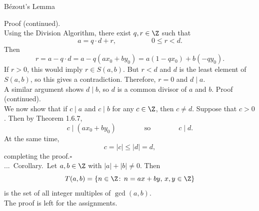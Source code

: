 \documentclass[smaller,hyperref={CJKbookmarks=true}]{beamer}
\newcounter{zhuo}[subsection]
\renewcommand{\thezhuo}{\thesection.\thesubsection.\arabic{zhuo}}
\newenvironment{COROLLARY}{\stepcounter{zhuo}\alert{\thezhuo.~Corollary.\,}}{}
\begin{document}
\begin{frame}{B\'{e}zout's Lemma}
\begin{spacing}{1.1}
\alert{Proof (continued).}\\
Using the Division Algorithm, there exist $q,r\in\Z$ such that
\[a=q\cdot d+r,\qquad\qquad\quad
0\leq r<d.\]
Then
\[r=a-q\cdot d=a-q(ax_0+by_0)=a(1-qx_0)+b(-qy_0).\]
If $r>0$, this would imply $r\in S(a,b)$. But $r<d$ and $d$ is the least element of $S(a,b)$, so this gives a contradiction. Therefore, $r=0$ and $d\mid a$.\\[5pt]
A similar argument shows $d\mid b$, so $d$ is a common divisor of $a$ and $b$.
\newpage
\alert{Proof (continued).}\\
We now show that if $c\mid a$ and $c\mid b$ for any $c\in\Z$, then $c\neq d$. Suppose that $c>0$. Then by Theorem 1.6.7,
\[c\mid(ax_0+by_0)\qquad\qquad\text{so}
\qquad\qquad c\mid d.\]
At the same time,
\[c=|c|\leq|d|=d,\]
completing the proof.\hfill $\square$\\[4pt]
\begin{COROLLARY}
Let $a,b\in\Z$ with $|a|+|b|\neq0$. Then
\[T(a,b)=\{n\in\Z\!:\,n=ax+by,\,x,y\in\Z\}\]
is the set of all integer multiples of $\gcd(a,b)$.
\end{COROLLARY}\\
The proof is left for the assignments.
\end{spacing}
\end{frame}
\end{document}
